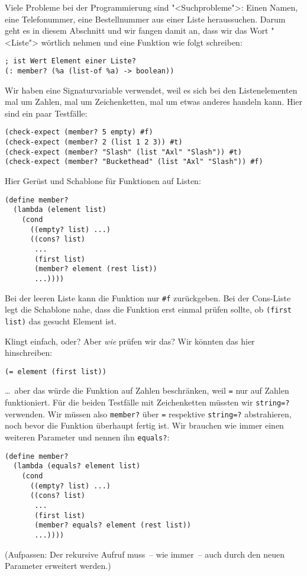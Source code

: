 Viele Probleme bei der Programmierung sind "<Suchprobleme">: Einen
Namen, eine Telefonummer, eine Bestellnummer aus einer Liste
heraussuchen.  Darum geht es in diesem Abschnitt und wir fangen damit
an, dass wir das Wort "<Liste"> wörtlich nehmen und eine Funktion wie
folgt schreiben:
%
\begin{lstlisting}
; ist Wert Element einer Liste?
(: member? (%a (list-of %a) -> boolean))
\end{lstlisting}
%
Wir haben eine Signaturvariable verwendet, weil es sich bei den
Listenelementen mal um Zahlen, mal um Zeichenketten, mal um etwas
anderes handeln kann.  Hier sind ein paar Testfälle:
%
\begin{lstlisting}
(check-expect (member? 5 empty) #f)
(check-expect (member? 2 (list 1 2 3)) #t)
(check-expect (member? "Slash" (list "Axl" "Slash")) #t)
(check-expect (member? "Buckethead" (list "Axl" "Slash")) #f)
\end{lstlisting}
%
Hier Gerüst und Schablone für Funktionen auf Listen:
%
\begin{lstlisting}
(define member?
  (lambda (element list)
    (cond
      ((empty? list) ...)
      ((cons? list)
       ... 
       (first list)
       (member? element (rest list))
       ...))))
\end{lstlisting}
%
Bei der leeren Liste kann die Funktion nur \lstinline{#f}
zurückgeben.  Bei der Cons-Liste legt die Schablone nahe, dass die
Funktion erst einmal prüfen sollte, ob \lstinline{(first list)} das
gesucht Element ist.

Klingt einfach, oder?  Aber \emph{wie} prüfen wir das?  Wir könnten
das hier hinschreiben:
%
\begin{lstlisting}
(= element (first list))
\end{lstlisting}
%
\ldots~aber das würde die Funktion auf Zahlen beschränken, weil
\lstinline{=} nur auf Zahlen funktioniert.  Für die beiden Testfälle
mit Zeichenketten müssten wir \lstinline{string=?} verwenden.  Wir
müssen also \lstinline{member?} über \lstinline{=} respektive
\lstinline{string=?} abstrahieren, noch bevor die Funktion überhaupt
fertig ist.  Wir brauchen wie immer einen weiteren Parameter und
nennen ihn \lstinline{equals?}:
%
\begin{lstlisting}
(define member?
  (lambda (equals? element list)
    (cond
      ((empty? list) ...)
      ((cons? list)
       ... 
       (first list)
       (member? equals? element (rest list))
       ...))))
\end{lstlisting}
%
(Aufpassen: Der rekursive Aufruf muss~-- wie immer~-- auch durch den
neuen Parameter erweitert werden.)

